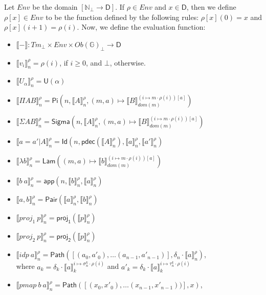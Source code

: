 \documentclass{amsart}
\theoremstyle{definition}
\theoremstyle{remark}
\newcommand{\D}{\mathsf{D}}
\newcommand{\bbG}{\mathbb{G}}
\newcommand{\nats}{\mathbb{N}}
\numberwithin{table}{section}
\begin{document}
Let $Env$ be the domain $[\nats_\bot \to \D]$.
If $\rho \in Env$ and $x \in \D$, then we define $\rho[x] \in Env$ to be the function defined by the following rules: $\rho[x](0) = x$ and $\rho[x](i+1) = \rho(i)$.
Now, we define the evaluation function:
\begin{itemize}
\item[] $\llbracket - \rrbracket : Tm_\bot \times Env \times Ob(\bbG)_\bot \to \D$
\item[] $\llbracket v_i \rrbracket^\rho_n = \rho(i)$, if $i \geq 0$, and $\bot$, otherwise.
\item[] $\llbracket U_\alpha \rrbracket^\rho_n = \mathsf{U}(\alpha)$
\item[] $\llbracket \Pi A B \rrbracket^\rho_n = \mathsf{Pi}(n, \llbracket A \rrbracket^\rho_n, (m, a) \mapsto \llbracket B \rrbracket^{(i \mapsto m \cdot \rho(i))[a]}_{dom(m)})$
\item[] $\llbracket \Sigma A B \rrbracket^\rho_n = \mathsf{Sigma}(n, \llbracket A \rrbracket^\rho_n, (m, a) \mapsto \llbracket B \rrbracket^{(i \mapsto m \cdot \rho(i))[a]}_{dom(m)})$
\item[] $\llbracket a = a' | A \rrbracket^\rho_n = \mathsf{Id}(n, \mathsf{pdec}(\llbracket A \rrbracket^\rho_n), \llbracket a \rrbracket^\rho_n, \llbracket a' \rrbracket^\rho_n)$
\item[] $\llbracket \lambda b \rrbracket^\rho_n = \mathsf{Lam}((m, a) \mapsto \llbracket b \rrbracket^{(i \mapsto m \cdot \rho(i))[a]}_{dom(m)})$
\item[] $\llbracket b\ a \rrbracket^\rho_n = \mathsf{app}(n, \llbracket b \rrbracket^\rho_n, \llbracket a \rrbracket^\rho_n)$
\item[] $\llbracket a, b \rrbracket^\rho_n = \mathsf{Pair}(\llbracket a \rrbracket^\rho_n, \llbracket b \rrbracket^\rho_n)$
\item[] $\llbracket proj_1\ p \rrbracket^\rho_n = \mathsf{proj_1}(\llbracket p \rrbracket^\rho_n)$
\item[] $\llbracket proj_2\ p \rrbracket^\rho_n = \mathsf{proj_2}(\llbracket p \rrbracket^\rho_n)$
\item[] $\llbracket idp\ a \rrbracket^\rho_n = \mathsf{Path}([(a_0, a'_0), \ldots (a_{n-1}, a'_{n-1})], \delta_n \cdot \llbracket a \rrbracket^\rho_n)$, \\
    \indent where $a_k  = \delta_k \cdot \llbracket a \rrbracket^{i \mapsto \sigma^k_n \cdot \rho(i)}_k$ and
                  $a'_k = \delta_k \cdot \llbracket a \rrbracket^{i \mapsto \tau^k_n \cdot \rho(i)}_k$
\item[] $\llbracket pmap\ b\ a \rrbracket^\rho_n = \mathsf{Path}([(x_0,x'_0), \ldots (x_{n-1},x'_{n-1}))], x)$, \\

\end{itemize}
\end{document}
